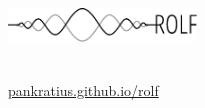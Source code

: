 \documentclass[a4paper]{article}
\begin{document}
	\vspace*{-1cm}
	\parbox{4cm}{\vspace{-0.2cm}\includegraphics[width=5cm]{../images/logo_scaled.pdf}}
	\parbox{12.5cm}{ \\
			\url{pankratius.github.io/rolf} \\ \vspace*{-.5cm} }
		\vspace{0.5cm}

\thispagestyle{empty}

\noindent







\end{document}
